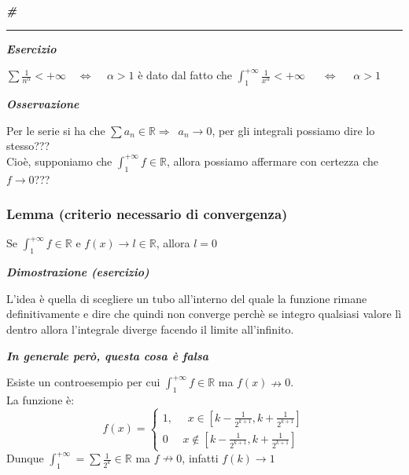 \documentclass{article}
\theoremstyle{definition}
\newcommand{\R}{\mathbb{R}}
\newcommand{\cvd}{\begin{center} \textbf{\textit{\#}} \end{center}}
\begin{document}
\cvd
\vspace{15pt}
\hrule
\vspace{15pt}
\begin{center}
    \textbf{\textit{Esercizio}}
\end{center}
$\sum \frac{1}{n^\alpha} < +\infty \,\,\,\,\,\, \Longleftrightarrow \,\,\,\,\,\,\, \alpha > 1$ è dato dal fatto che $\int_1^{+\infty}\frac{1}{x^\alpha}<+\infty \,\,\,\,\,\,\,\,\, \Longleftrightarrow \,\,\,\,\,\,\,\, \alpha > 1$
\begin{center}
    \textbf{\textit{Osservazione}}
\end{center}
Per le serie si ha che $\sum a_n \in \R \Longrightarrow \,\,\, a_n \to 0$, per gli integrali possiamo dire lo stesso???
\\
Cioè, supponiamo che $\int_1^{+\infty}f \in \R$, allora possiamo affermare con certezza che $f \to 0$???




\subsubsection{Lemma (criterio necessario di convergenza)}
Se $\int_1^{+\infty}f \in \R$ e $f(x) \to l \in \R$, allora $l=0$

\begin{center}
    \textbf{\textit{Dimostrazione (esercizio)}}
\end{center}
L'idea è quella di scegliere un tubo all'interno del quale la funzione rimane definitivamente e dire che quindi non converge perchè se integro qualsiasi valore lì dentro allora l'integrale diverge facendo il limite all'infinito.

\begin{center}
    \textbf{\textit{In generale però, questa cosa è falsa}}
\end{center}
Esiste un controesempio per cui $\int_1^{+\infty}f \in \R$ ma $f(x) \nrightarrow 0$.
\\
La funzione è:
\begin{equation*}
    f(x)=\begin{cases}
        1, \,\,\,\,\,\,\,\, x \in [k-\frac{1}{2^{k+1}},k+\frac{1}{2^{k+1}}] \\
        0 \,\,\,\,\,\,\,\, x \notin [k-\frac{1}{2^{k+1}},k+\frac{1}{2^{k+1}}]
    \end{cases}
\end{equation*}
Dunque $\int_1^{+\infty}=\sum \frac{1}{2^k} \in \R$ ma $f \nrightarrow 0$, infatti $f(k) \to 1$
\end{document}
